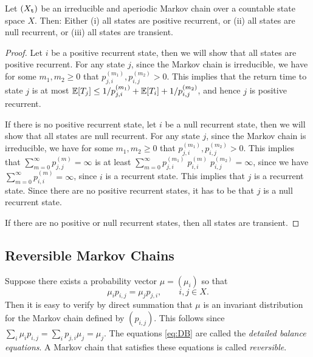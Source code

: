\begin{theorem}
\label{thm:countableMC}
Let $({X_{\tt t}})$ be an irreducible and aperiodic Markov chain
over a countable state space $X$.  Then:
Either (i) all states are positive recurrent, or (ii) all states are null recurrent, or (iii) all states are transient.
\end{theorem}


\begin{proof}
Let $i$ be a positive recurrent state, then we will show that all
states are positive recurrent. For any state $j$, since the Markov
chain is irreducible, we have for some $m_1,m_2\geq 0$ that
$p^{(m_1)}_{j,i},p^{(m_2)}_{i,j}>0$. This implies that
the return
time to state $j$ is at most $\mathbb{E}[T_j]\leq
1/p^{(m_1)}_{j,i}+\mathbb{E}[T_i]+1/p^{(m_2)}_{i,j}$, and hence $j$ is
positive recurrent.

If there is no positive recurrent state, let $i$ be a null recurrent
state, then we will show that all states are null recurrent. For any
state $j$, since the Markov chain is irreducible, we have for some
$m_1,m_2\geq 0$ that $p^{(m_1)}_{j,i},p^{(m_2)}_{i,j}>0$. This implies that  $\sum_{m=0}^\infty p^{(m)}_{j,j}=\infty$
%
%
is at least
$\sum_{m=0}^\infty
p^{(m_1)}_{j,i}\;p^{(m)}_{i,i}\;p^{(m_2)}_{i,j}=\infty$, since we
have $\sum_{m=0}^\infty p^{(m)}_{i,i}=\infty$, since $i$ is a
recurrent state. This implies that $j$ is a recurrent state. Since
there are no positive recurrent states, it has to be that $j$ is a
null recurrent state.

If there are no positive or null recurrent states, then all states
are transient.
%
%
%
\end{proof}

\subsection{Reversible Markov Chains} 
Suppose there exists a probability vector $\mu  = ({\mu_i})$ so that
\begin{equation}\label{eq:DB}
{\mu _i}{p_{i,j}} = {\mu _j}{p_{j,i}},\quad \quad i,j \in X.
\end{equation}
Then it is easy to verify by direct summation that $\mu $ is an
invariant distribution for the Markov chain defined by
$({p_{i,j}})$. This follows since $\sum_i \mu_i p_{i,j}=\sum_i
p_{j,i}\mu_j=\mu_j$. The equations \eqref{eq:DB} are called the
\emph{detailed balance equations}. A Markov chain that satisfies
these equations is called \emph{reversible}.

